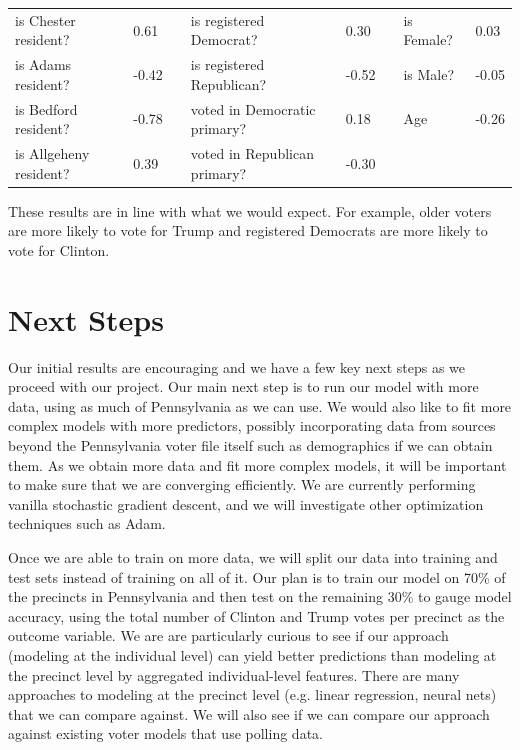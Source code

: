 \documentclass[10pt, letterpaper]{article}
\begin{document}
\begin{table}[H]
\centering
\begin{tabular}{|l|l|l|l|l|lll}
\cline{1-2} \cline{4-5} \cline{7-8}
is Chester resident?   & 0.61  &  & is registered Democrat?      & 0.30  & \multicolumn{1}{l|}{} & \multicolumn{1}{l|}{is Female?} & \multicolumn{1}{l|}{0.03}  \\ \cline{1-2} \cline{4-5} \cline{7-8} 
is Adams resident?     & -0.42 &  & is registered Republican?    & -0.52 & \multicolumn{1}{l|}{} & \multicolumn{1}{l|}{is Male?}   & \multicolumn{1}{l|}{-0.05} \\ \cline{1-2} \cline{4-5} \cline{7-8} 
is Bedford resident?   & -0.78 &  & voted in Democratic primary? & 0.18  & \multicolumn{1}{l|}{} & \multicolumn{1}{l|}{Age}        & \multicolumn{1}{l|}{-0.26} \\ \cline{1-2} \cline{4-5} \cline{7-8} 
is Allgeheny resident? & 0.39  &  & voted in Republican primary? & -0.30 &                       &                                 &                            \\ \cline{1-2} \cline{4-5}
\end{tabular}
\end{table}
These results are in line with what we would expect. For example, older voters are more likely to vote for Trump and registered Democrats are more likely to vote for Clinton.

\section{Next Steps}

Our initial results are encouraging and we have a few key next steps as we proceed with our project. Our main next step is to run our model with more data, using as much of Pennsylvania as we can use. We would also like to fit more complex models with more predictors, possibly incorporating data from sources beyond the Pennsylvania voter file itself such as demographics if we can obtain them. As we obtain more data and fit more complex models, it will be important to make sure that we are converging efficiently. We are currently performing vanilla stochastic gradient descent, and we will investigate other optimization techniques such as Adam.

Once we are able to train on more data, we will split our data into training and test sets instead of training on all of it. Our plan is to train our model on 70\% of the precincts in Pennsylvania and then test on the remaining 30\% to gauge model accuracy, using the total number of Clinton and Trump votes per precinct as the outcome variable. We are are particularly curious to see if our approach (modeling at the individual level) can yield better predictions than modeling at the precinct level by aggregated individual-level features. There are many approaches to modeling at the precinct level (e.g. linear regression, neural nets) that we can compare against. We will also see if we can compare our approach against existing voter models that use polling data.
\end{document}
